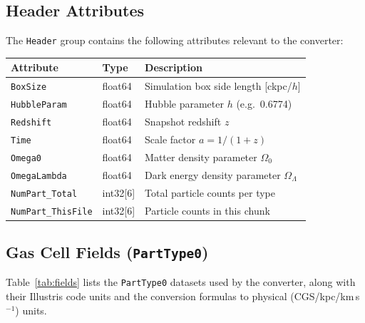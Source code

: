 \documentclass[english,a4paper]{my_memo}
\begin{document}
\subsection{Header Attributes}

The \texttt{Header} group contains the following attributes relevant to
the converter:

\begin{center}
\begin{tabular}{llp{7.5cm}}
\toprule
\textbf{Attribute} & \textbf{Type} & \textbf{Description} \\
\midrule
\texttt{BoxSize}        & float64 & Simulation box side length [ckpc/$h$] \\
\texttt{HubbleParam}    & float64 & Hubble parameter $h$ (e.g.\ 0.6774) \\
\texttt{Redshift}       & float64 & Snapshot redshift $z$ \\
\texttt{Time}           & float64 & Scale factor $a = 1/(1+z)$ \\
\texttt{Omega0}         & float64 & Matter density parameter $\Omega_0$ \\
\texttt{OmegaLambda}    & float64 & Dark energy density parameter $\Omega_\Lambda$ \\
\texttt{NumPart\_Total} & int32[6]& Total particle counts per type \\
\texttt{NumPart\_ThisFile} & int32[6] & Particle counts in this chunk \\
\bottomrule
\end{tabular}
\end{center}

\subsection{Gas Cell Fields (\texttt{PartType0})}
\label{sec:fields}

Table~\ref{tab:fields} lists the \texttt{PartType0} datasets used by
the converter, along with their Illustris code units and the conversion
formulas to physical (CGS/kpc/km\,s$^{-1}$) units.
\end{document}
